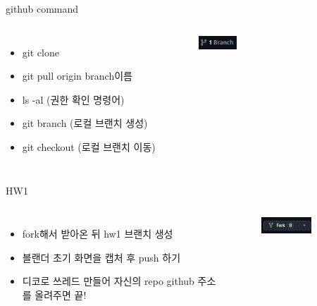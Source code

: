 \documentclass[12pt]{beamer}
\begin{document}
\begin{frame}{github command}
    \begin{columns}
            \begin{itemize}
                \item git clone \newline
                \item git pull origin branch이름 \newline
                \item ls -al (권한 확인 명령어)
                \item git branch (로컬 브랜치 생성)
                \item git checkout (로컬 브랜치 이동)
            \end{itemize}

            \begin{figure}[t]
            \centering
            \includegraphics[width=0.7\textwidth]{image/branch.png}
            \end{figure}
    \end{columns}
\end{frame}

\begin{frame}{HW1}
    \begin{columns}
            \begin{itemize}
                \item fork해서 받아온 뒤 hw1 브랜치 생성
                \item 블랜더 초기 화면을 캡처 후 push 하기
                \item 디코로 쓰레드 만들어 자신의 repo github 주소를 올려주면 끝!
            \end{itemize}

            \begin{figure}[t]
            \centering
            \includegraphics[width=0.7\textwidth]{image/fork.png}
            \end{figure}
    \end{columns}
\end{frame}
\end{document}

